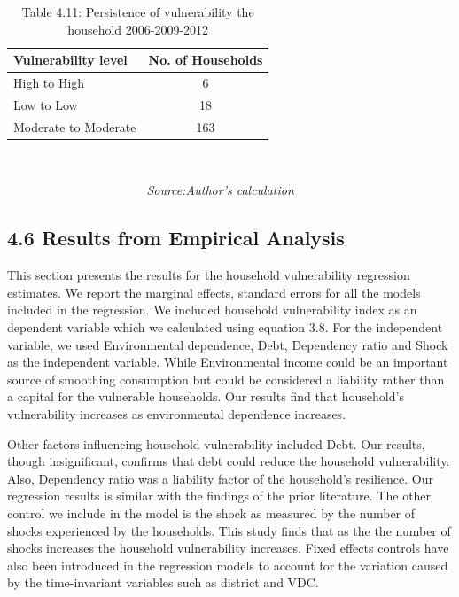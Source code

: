 \documentclass[12pt, a4paper]{article}
\begin{document}
\begin{table}[H]
	\captionsetup{labelformat=empty}
	\captionsetup{labelformat=empty, skip=-7pt} %
	\caption{{Table 4.11}: Persistence of vulnerability the household 2006-2009-2012}
	\label{tab:Vulnerabilitypersistence}
	\begin{center}
	\begin{tabular}{lc} \hline
		\textbf{Vulnerability level} & \textbf{No. of Households} \\	\hline
		High to High & 6 \\
		Low to Low            & 18         \\
		Moderate to Moderate  & 163  \\ \hline \hline     
	\end{tabular} \\
	\end{center}\vspace{-8pt}
	\textit{\ \ \ \ \ \ \ \ \ \ \ \ \ \ \ \ \ \ \ \ \ \ Source:Author's calculation}
	\end{table}

\clearpage
\subsection*{4.6 Results from Empirical Analysis}
\renewcommand{\thepage}{\arabic{page}}
This section presents the results for the household vulnerability regression estimates. We report the marginal effects, standard errors for all the models included in the regression. We included household vulnerability index as an dependent variable which we calculated using equation 3.8. For the independent variable, we used Environmental dependence, Debt, Dependency ratio and Shock as the independent variable. While Environmental income could be an important source of smoothing consumption but could be considered a liability rather than a capital for the vulnerable households.  Our results find that household's vulnerability increases as environmental dependence increases. 

Other factors influencing household vulnerability included Debt. Our results, though insignificant, confirms that debt could reduce the household vulnerability. Also, Dependency ratio was a liability factor of the household's resilience. Our regression results is similar with the findings of the prior literature. The other control we include in the model is the shock as measured by the number of shocks experienced by the households. This study finds that as the the number of shocks increases the household vulnerability increases. Fixed effects controls have also been introduced in the regression models to account for the variation caused by the time-invariant variables such as district and VDC.
\end{document}
